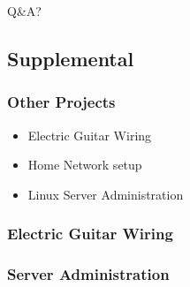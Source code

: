\documentclass[aspectratio=169]{beamer}
\begin{document}
\begin{frame}
\Huge{\centerline{Q\&A?}}
\end{frame}

\subsection{Supplemental}

\begin{frame}
  \frametitle{Other Projects}
  \begin{itemize}
  \item Electric Guitar Wiring
  \item Home Network setup
  \item Linux Server Administration
  \end{itemize}
  
\end{frame}

\begin{frame}
  \frametitle{Electric Guitar Wiring}
\end{frame}

\begin{frame}
\frametitle{Server Administration}
\end{frame}
\end{document}
